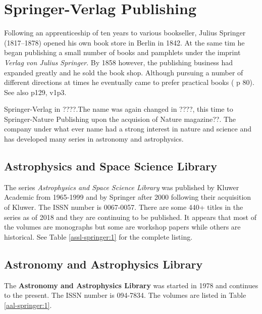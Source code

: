 \section{Springer-Verlag Publishing}

Following an apprenticeship of ten years to various bookseller, Julius
Springer (1817--1878) opened his own book store in Berlin in 1842. At
the same tim he began publishing a small number of books and pamphlets
under the imprint {\it Verlag von Julius Springer}.  By 1858 however,
the publishing business had expanded greatly and he sold the book
shop. Although pursuing a number of different directions at times he
eventually came to prefer practical books (\cite{Sarkowski1996} p 80).
See also p129, v1p3.

Springer-Verlag in ????.The name was again changed in ????, this time
to Springer-Nature Publishing upon the acquision of Nature magazine??.
The company under what ever name had a strong interest in nature and
science and has developed many series in astronomy and astrophysics.

\subsection{Astrophysics and Space Science Library}

The series {\it Astrophysics and Space Science Library} was published
by Kluwer Academic from 1965-1999 and by Springer after 2000 following
their acquisition of Kluwer.  The ISSN number is 0067-0057. There are
some 440+ titles in the series as of 2018 and they are continuing to
be published.  It appears that most of the volumes are monographs but
some are workshop papers while others are historical. See Table
\ref{assl-springer:1} for the complete listing.

\subsection{Astronomy and Astrophysics Library}
  
The {\bf Astronomy and Astrophysics Library} was started in 1978 and
continues to the present. The ISSN number is 094-7834. The volumes are
listed in Table \ref{aal-springer:1}.
